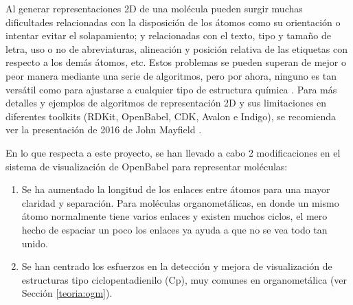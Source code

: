 Al generar representaciones 2D de una molécula pueden surgir muchas dificultades relacionadas con la disposición de los átomos como su orientación o intentar evitar el solapamiento; y relacionadas con el texto, tipo y tamaño de letra, uso o no de abreviaturas, alineación y posición relativa de las etiquetas con respecto a los demás átomos, etc. Estos problemas se pueden superan de mejor o peor manera mediante una serie de algoritmos, pero por ahora, ninguno es tan versátil como para ajustarse a cualquier tipo de estructura química \cite{david_molecular_2020}. Para más detalles y ejemplos de algoritmos de representación 2D y sus limitaciones en diferentes toolkits (RDKit, OpenBabel, CDK, Avalon e Indigo), se recomienda ver la presentación de 2016 de John Mayfield \cite{comparative_depictions}.

En lo que respecta a este proyecto, se han llevado a cabo 2 modificaciones en el sistema de visualización de OpenBabel para representar moléculas:
\begin{enumerate}
    \item Se ha aumentado la longitud de los enlaces entre átomos para una mayor claridad y separación. Para moléculas organometálicas, en donde un mismo átomo normalmente tiene varios enlaces y existen muchos ciclos, el mero hecho de espaciar un poco los enlaces ya ayuda a que no se vea todo tan unido.
    \item Se han centrado los esfuerzos en la detección y mejora de visualización de estructuras tipo ciclopentadienilo (Cp), muy comunes en organometálica (ver Sección \ref{teoria:ogm}).
\end{enumerate}


